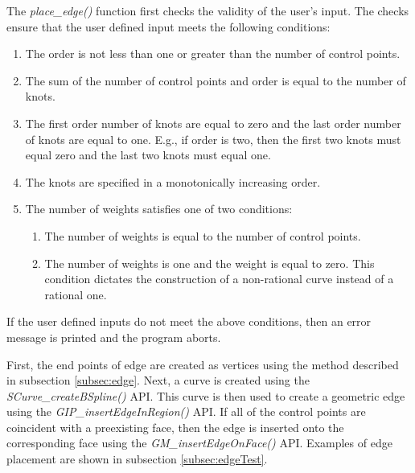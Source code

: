 \documentclass[a4paper, 12pt]{article}
\begin{document}
The \emph{place\_edge()} function first checks the 
validity of the user's input.
The checks ensure that the user defined input meets 
the following conditions:
\begin{enumerate}
  \item The order is not less than one or greater than the number 
      of control points.
  \item The sum of the number of control points and order is equal to 
      the number of knots.
  \item The first order number of knots are equal to zero and 
      the last order number 
      of knots are equal to one. E.g., if order is two, then the first two 
      knots must equal zero and the last two knots must equal one.
  \item The knots are specified in a monotonically increasing order. 
  \item The number of weights satisfies one of two conditions:
    \begin{enumerate}
      \item The number of weights is equal to the number of control points.
      \item The number of weights is one and the weight is equal to zero. 
          This condition dictates the construction of a non-rational curve
          instead of a rational one.
    \end{enumerate}
\end{enumerate}

If the user defined inputs do not meet the above conditions, then an error 
message is printed and the program aborts.

First, the end points of edge are created as vertices using the 
method described in subsection \ref{subsec:edge}. Next, a curve
is created using the \emph{SCurve\_createBSpline()} API. This 
curve is then used to create a geometric edge using the 
\emph{GIP\_insertEdgeInRegion()} API. If all of the 
control points are coincident with a preexisting face, then the
edge is inserted onto the corresponding face using the 
\emph{GM\_insertEdgeOnFace()} API. Examples of edge placement
are shown in subsection \ref{subsec:edgeTest}.
\end{document}
